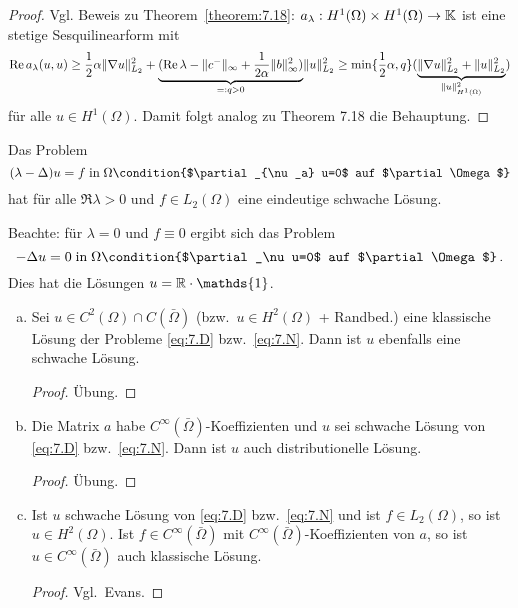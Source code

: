 \begin{proof}
  Vgl. Beweis zu Theorem~\ref{theorem:7.18}: $a_\lambda:H^1(\Omega)\times H^1(\Omega)\rightarrow\mathbb{K}$ ist eine stetige Sesquilinearform mit
  \begin{dmath*}
    \Re a_\lambda(u,u)\geq\frac 12\alpha\norm{\nabla u}_{L_2}^2+
    \underbrace{(\Re\lambda-\norm{c^-}_\infty+\frac1{2\alpha}\norm b_\infty^2)}_{=:q>0} \norm{u}^2_{L_2}
    \geq\min\{\frac 12\alpha,q\}(\underbrace{\norm{\nabla u}_{L_2}^2+\norm u_{L_2}^2}_{\norm u_{H^1(\Omega)}^2})
  \end{dmath*}
  für alle $u\in H^1(\Omega)$. Damit folgt analog zu Theorem 7.18 die Behauptung.
\end{proof}

\begin{bsp*}
  Das Problem
  \begin{dmath*}
    (\lambda-\Delta)u=f\;\text{in}\;\Omega
    \condition{$\partial_{\nu_a} u=0$ auf $\partial\Omega$}
  \end{dmath*}
  hat für alle $\Re\lambda>0$ und $f\in L_2(\Omega)$ eine eindeutige schwache Lösung.

  Beachte: für $\lambda=0$ und $f\equiv0$ ergibt sich das Problem
  \begin{dmath*}
    -\Delta u=0\;\text{in}\;\Omega
    \condition{$\partial_\nu u=0$ auf $\partial\Omega$}\, .
  \end{dmath*}
  Dies hat die Lösungen $u=\R\cdot\mathds{1}$.
\end{bsp*}

\begin{bem}
  \label{bem:7.20}
  \begin{enumerate}[(a)]
  \item \label{bem:7.20-1} Sei $u\in C^2(\Omega)\cap C(\bar\Omega)$ (bzw.\ $u\in H^2(\Omega)$ + Randbed.) eine klassische Lösung der Probleme \eqref{eq:7.D} bzw.\ \eqref{eq:7.N}. Dann ist $u$ ebenfalls eine schwache Lösung.
    \begin{proof}
      Übung.
    \end{proof}
  \item Die Matrix $a$ habe $C^\infty(\bar\Omega)$-Koeffizienten und $u$ sei schwache Lösung von \eqref{eq:7.D} bzw.\ \eqref{eq:7.N}. Dann ist $u$ auch distributionelle Lösung.
  \begin{proof}
  Übung.
  \end{proof}
  \item Ist $u$ schwache Lösung von \eqref{eq:7.D} bzw.\ \eqref{eq:7.N} und ist $f\in L_2(\Omega)$, so ist $u\in H^2(\Omega)$. Ist $f\in C^\infty(\bar\Omega)$ mit $C^\infty(\bar\Omega)$-Koeffizienten von $a$, so ist $u\in C^\infty(\bar\Omega)$ auch klassische Lösung.
    \begin{proof}
      Vgl.\ Evans.
    \end{proof}
  \end{enumerate}
\end{bem}

